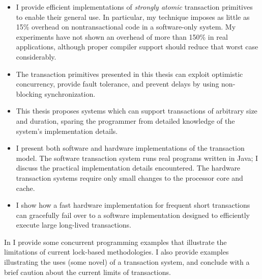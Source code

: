 \begin{itemize}
\item I provide efficient implementations of
\textit{strongly atomic} transaction primitives to enable their general use.
In particular, my technique imposes as little as 15\% overhead on
nontransactional code in a software-only system.  My experiments have
not shown an overhead of more than 150\% in real applications,
although proper compiler support should reduce that worst case
considerably.%

\item The transaction
primitives presented in this thesis can exploit optimistic
concurrency, provide fault tolerance, and prevent delays by using
non-blocking synchronization.

\item This thesis proposes systems which can support transactions of
arbitrary size and duration, sparing the programmer from detailed
knowledge of the system's implementation details.

\item I present both software and hardware implementations of the
transaction model.
The software transaction system runs real programs written in
Java; I discuss the practical implementation details encountered.
The hardware transaction systems require only small changes to the
processor core and cache.

\item I show how a fast hardware implementation for
frequent short transactions can gracefully fail over to a software
implementation designed to efficiently execute large long-lived
transactions.
\end{itemize}

In  I provide some concurrent programming
examples that illustrate the limitations of current lock-based
methodologies.  I also provide examples illustrating the uses
(some novel) of a transaction system, and conclude with a brief
caution about the current limits of transactions.

